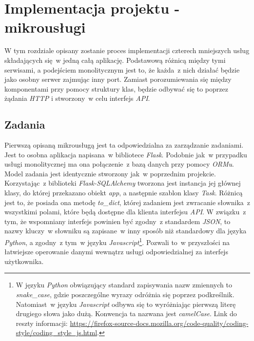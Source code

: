 \chapter{Implementacja projektu - mikrousługi}
\label{roz5}
W tym rozdziale opisany zostanie proces implementacji czterech mniejszych usług składających się~w jedną całą aplikację. Podstawową różnicą między tymi serwisami, a podejściem monolitycznym jest to, że każda~z nich działać będzie jako osobny serwer zajmując inny port. Zamiast porozumiewania się między komponentami przy pomocy struktury klas, będzie odbywać się to poprzez żądania \textit{HTTP} i stworzony~w celu interfejs \textit{API}.

\section{Zadania}
Pierwszą opisaną mikrousługą jest ta odpowiedzialna za zarządzanie zadaniami. Jest to osobna aplikacja napisana~w bibliotece \textit{Flask}. Podobnie jak~w przypadku usługi monolitycznej ma ona połączenie~z bazą danych przy pomocy \textit{ORMu}. Model zadania jest identycznie stworzony jak~w poprzednim projekcie. Korzystając~z biblioteki \textit{Flask-SQLAlchemy} tworzona jest instancja jej głównej klasy, do której przekazano obiekt \textit{app}, a następnie szablon klasy \textit{Task}. Różnicą jest to, że posiada ona metodę \textit{to\_dict}, której zadaniem jest zwracanie słownika~z wszystkimi polami, które będą dostępne dla klienta interfejsu \textit{API}. W związku~z tym, że wspomniany interfejs powinien być zgodny~z standardem \textit{JSON}, to nazwy kluczy~w słowniku są zapisane~w inny sposób niż standardowy dla języka \textit{Python}, a zgodny~z tym~w języku \textit{Javascript}\footnote{W języku \textit{Python} obwiązujący standard zapisywania nazw zmiennych to \textit{snake\_case}\cite{python}, gdzie poszczególne wyrazy odróżnia się poprzez podkreślnik. Natomiast~w języku \textit{Javascript} odbywa się to wyróżniając pierwszą literę drugiego słowa jako dużą. Konwencja ta nazwana jest \textit{camelCase}. Link do reszty informacji: \url{https://firefox-source-docs.mozilla.org/code-quality/coding-style/coding_style_js.html}.}. Pozwali to~w przyszłości na łatwiejsze operowanie danymi wewnątrz usługi odpowiedzialnej za interfejs użytkownika.

